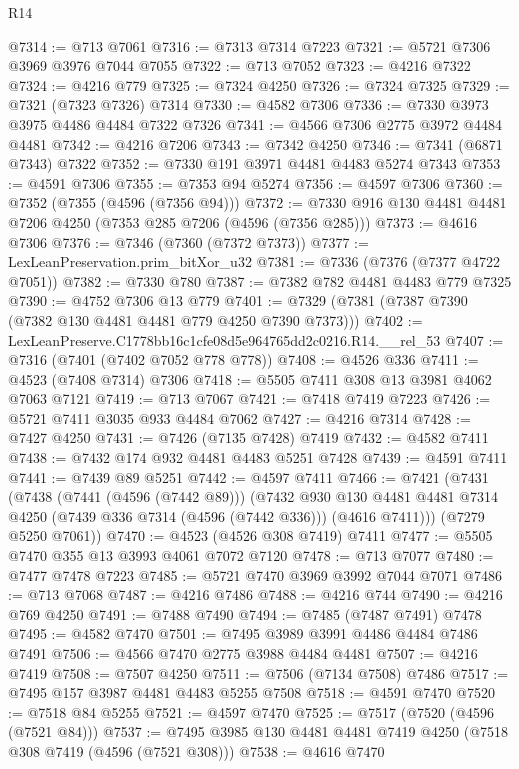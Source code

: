 \begin{lexlean}{R14}
\begin{coremodule}
@7314 := @713 @7061
@7316 := @7313 @7314 @7223
@7321 := @5721 @7306 @3969 @3976 @7044 @7055
@7322 := @713 @7052
@7323 := @4216 @7322
@7324 := @4216 @779
@7325 := @7324 @4250
@7326 := @7324 @7325
@7329 := @7321 (@7323 @7326) @7314
@7330 := @4582 @7306
@7336 := @7330 @3973 @3975 @4486 @4484 @7322 @7326
@7341 := @4566 @7306 @2775 @3972 @4484 @4481
@7342 := @4216 @7206
@7343 := @7342 @4250
@7346 := @7341 (@6871 @7343) @7322
@7352 := @7330 @191 @3971 @4481 @4483 @5274 @7343
@7353 := @4591 @7306
@7355 := @7353 @94 @5274
@7356 := @4597 @7306
@7360 := @7352 (@7355 (@4596 (@7356 @94)))
@7372 := @7330 @916 @130 @4481 @4481 @7206 @4250 (@7353 @285 @7206 (@4596 (@7356 @285)))
@7373 := @4616 @7306
@7376 := @7346 (@7360 (@7372 @7373))
@7377 := LexLeanPreservation.prim_bitXor_u32
@7381 := @7336 (@7376 (@7377 @4722 @7051))
@7382 := @7330 @780
@7387 := @7382 @782 @4481 @4483 @779 @7325
@7390 := @4752 @7306 @13 @779
@7401 := @7329 (@7381 (@7387 @7390 (@7382 @130 @4481 @4481 @779 @4250 @7390 @7373)))
@7402 := LexLeanPreserve.C1778bb16c1cfe08d5e964765dd2c0216.R14.__rel_53
@7407 := @7316 (@7401 (@7402 @7052 @778 @778))
@7408 := @4526 @336
@7411 := @4523 (@7408 @7314) @7306
@7418 := @5505 @7411 @308 @13 @3981 @4062 @7063 @7121
@7419 := @713 @7067
@7421 := @7418 @7419 @7223
@7426 := @5721 @7411 @3035 @933 @4484 @7062
@7427 := @4216 @7314
@7428 := @7427 @4250
@7431 := @7426 (@7135 @7428) @7419
@7432 := @4582 @7411
@7438 := @7432 @174 @932 @4481 @4483 @5251 @7428
@7439 := @4591 @7411
@7441 := @7439 @89 @5251
@7442 := @4597 @7411
@7466 := @7421
    (@7431
      (@7438
        (@7441 (@4596 (@7442 @89)))
        (@7432
          @930
          @130
          @4481
          @4481
          @7314
          @4250
          (@7439 @336 @7314 (@4596 (@7442 @336)))
          (@4616 @7411)))
      (@7279 @5250 @7061))
@7470 := @4523 (@4526 @308 @7419) @7411
@7477 := @5505 @7470 @355 @13 @3993 @4061 @7072 @7120
@7478 := @713 @7077
@7480 := @7477 @7478 @7223
@7485 := @5721 @7470 @3969 @3992 @7044 @7071
@7486 := @713 @7068
@7487 := @4216 @7486
@7488 := @4216 @744
@7490 := @4216 @769 @4250
@7491 := @7488 @7490
@7494 := @7485 (@7487 @7491) @7478
@7495 := @4582 @7470
@7501 := @7495 @3989 @3991 @4486 @4484 @7486 @7491
@7506 := @4566 @7470 @2775 @3988 @4484 @4481
@7507 := @4216 @7419
@7508 := @7507 @4250
@7511 := @7506 (@7134 @7508) @7486
@7517 := @7495 @157 @3987 @4481 @4483 @5255 @7508
@7518 := @4591 @7470
@7520 := @7518 @84 @5255
@7521 := @4597 @7470
@7525 := @7517 (@7520 (@4596 (@7521 @84)))
@7537 := @7495 @3985 @130 @4481 @4481 @7419 @4250 (@7518 @308 @7419 (@4596 (@7521 @308)))
@7538 := @4616 @7470

\end{coremodule}
\end{lexlean}
